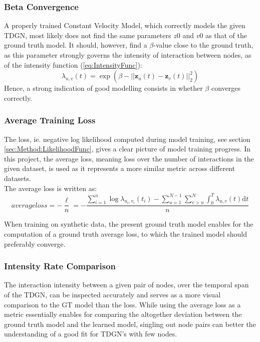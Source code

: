 \subsubsection{Beta Convergence}
\label{sec:Method:Evaluation:BetaConvergence}
A properly trained Constant Velocity Model, which correctly models the given TDGN, most likely does not find the same parameters $z0$ and $v0$ as that of the ground truth model.
It should, however, find a $\beta$-value close to the ground truth, as this parameter strongly governs the intensity of interaction between nodes, as of the intensity function (\ref{eq:IntensityFunc}):
\begin{equation*}
    \lambda_{u,v}(t)
    =
    \exp \left(\beta - ||\textbf{z}_u(t) - \textbf{z}_v(t)||_2^2\right)
\end{equation*}
Hence, a strong indication of good modelling consists in whether $\beta$ converges correctly.


\subsubsection{Average Training Loss}
\label{sec:Method:Evaluation:Loss}
The loss, ie. negative log likelihood computed during model training, see section \ref{sec:Method:LikelihoodFunc}, gives a clear picture of model training progress.
In this project, the average loss, meaning loss over the number of interactions in the given dataset, is used as it represents a more similar metric across different datasets.
\\
The average loss is written as:
\begin{equation}
   average loss = - \frac{\ell}{n} = - \frac{\sum_{i=1}^n \log \lambda_{u_i,v_i} (t_i) - \sum_{u=1}^{N-1} \sum_{v > u}^{N} \int_{0}^T \lambda_{u,v}(t) \mathrm{d} t}{n}
    \label{eq:LogLikelihoodFuncExplicit}
\end{equation}

When training on synthetic data, the present ground truth model enables for the computation of a ground truth average loss, to which the trained model should preferably converge.


\subsubsection{Intensity Rate Comparison}
\label{sec:Method:Evaluation:Intensity}
The interaction intensity between a given pair of nodes, over the temporal span of the TDGN, can be inspected accurately and serves as a more visual comparison to the GT model than the loss. 
While using the average loss as a metric essentially enables for comparing the altogether deviation between the ground truth model and the learned model, singling out node pairs can better the understanding of a good fit for TDGN's with few nodes.

